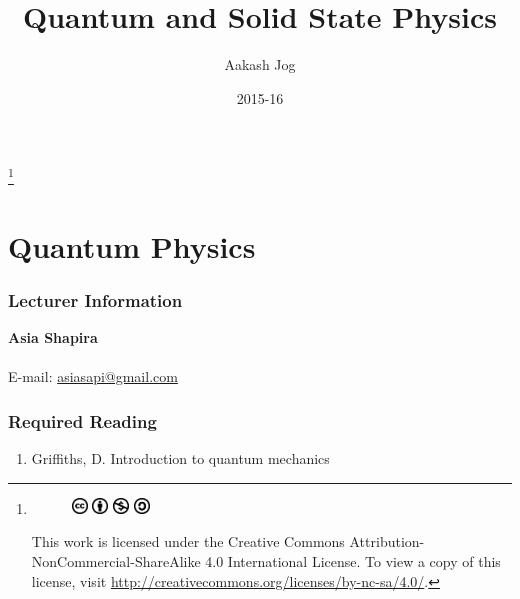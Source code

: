 \documentclass[titlepage, fleqn, a4paper, 12pt, twoside]{article}
\title{Quantum and Solid State Physics}
\author{Aakash Jog}
\date{2015-16}
\theoremstyle{definition}
\theoremstyle{theorem}
\newcommand\blfootnote[1]{%
	\begingroup
	\renewcommand\thefootnote{}\footnote{#1}%
	\addtocounter{footnote}{-1}%
	\endgroup
}
\begin{document}
\maketitle

\blfootnote
{	
	\begin{figure}[H]
		\includegraphics[height = 12pt]{cc.eps}
		\includegraphics[height = 12pt]{by.eps}
		\includegraphics[height = 12pt]{nc.eps}
		\includegraphics[height = 12pt]{sa.eps}
	\end{figure}
	This work is licensed under the Creative Commons Attribution-NonCommercial-ShareAlike 4.0 International License. To view a copy of this license, visit \url{http://creativecommons.org/licenses/by-nc-sa/4.0/}.
} %

\tableofcontents

\newpage
\listoffigures

\newpage
{}
\part{Quantum Physics}

\section{Lecturer Information}

\textbf{Asia Shapira}\\
~\\
E-mail: \href{mailto:asiasapi@gmail.com}{asiasapi@gmail.com}\\

\section{Required Reading}

\begin{enumerate}
	\item Griffiths, D. Introduction to quantum mechanics
\end{enumerate}
\end{document}
